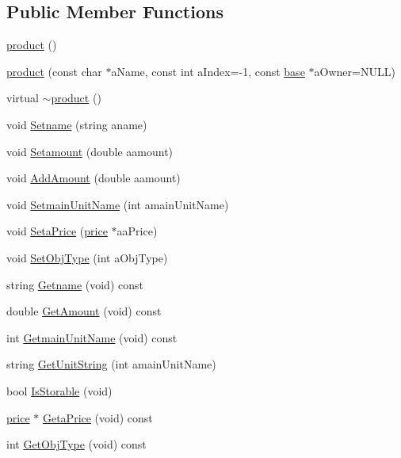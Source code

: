 \subsection*{Public Member Functions}
\begin{DoxyCompactItemize}
\item 
\hyperlink{classproduct_aeb2cf841e901baf1488c1779dfe665b7}{product} ()
\item 
\hyperlink{classproduct_ab81620d4367bf48de48c8ccad77570a4}{product} (const char $\ast$aName, const int aIndex=-\/1, const \hyperlink{classbase}{base} $\ast$aOwner=NULL)
\item 
virtual \hyperlink{classproduct_a089282937d729c1374710166c0398c98}{$\sim$product} ()
\item 
void \hyperlink{classproduct_a0219cde65dc26376f3371a0138199ba8}{Setname} (string aname)
\item 
void \hyperlink{classproduct_a18ec2e96f1d9b7cef74c4b2800ebdca1}{Setamount} (double aamount)
\item 
void \hyperlink{classproduct_a26b6891b511237f0a054b3996a4c51bf}{AddAmount} (double aamount)
\item 
void \hyperlink{classproduct_a8d465d7ad5be0f04a8360a698ae8cb4a}{SetmainUnitName} (int amainUnitName)
\item 
void \hyperlink{classproduct_a3ddf147bd1739c0468d6572d04e1f993}{SetaPrice} (\hyperlink{classprice}{price} $\ast$aaPrice)
\item 
void \hyperlink{classproduct_a885b4a4a79f193386ef9648b99839978}{SetObjType} (int aObjType)
\item 
string \hyperlink{classproduct_a30dda8ef0877194db7965bc7a730c401}{Getname} (void) const 
\item 
double \hyperlink{classproduct_a021ebef2da57e1d977cfe57e62c6e38b}{GetAmount} (void) const 
\item 
int \hyperlink{classproduct_a28f9ed799fc616fd9c40250abfbfe0df}{GetmainUnitName} (void) const 
\item 
string \hyperlink{classproduct_abd6e5f2d134fc6035418741240e3f40e}{GetUnitString} (int amainUnitName)
\item 
bool \hyperlink{classproduct_ad3ece795eecdb5f72f1d4dbeceee9c94}{IsStorable} (void)
\item 
\hyperlink{classprice}{price} $\ast$ \hyperlink{classproduct_a4fb7108257c255930ec5b09fad050340}{GetaPrice} (void) const 
\item 
int \hyperlink{classproduct_a40d4aad85cc18137f74782e0cafe0df5}{GetObjType} (void) const 
\item 

\end{DoxyCompactItemize}
